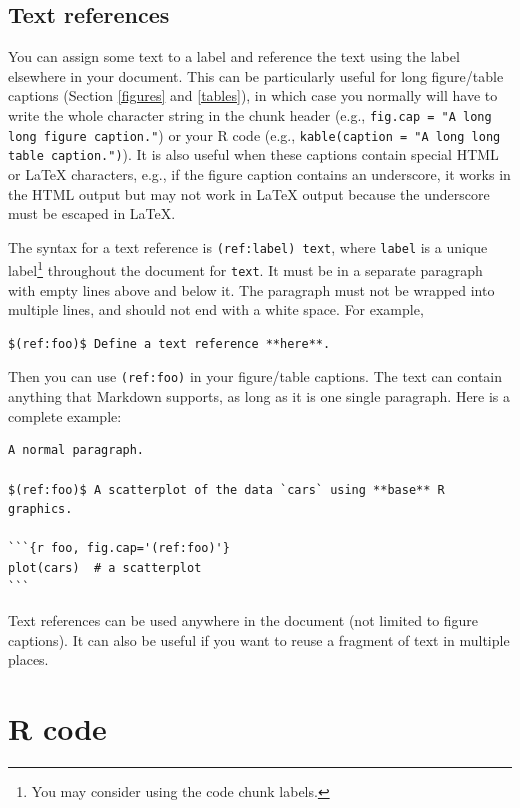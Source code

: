 \documentclass[doctor,openright,twoside]{sjtuthesis}
\newcommand{\passthrough}[1]{#1}
\theoremstyle{plain}
\theoremstyle{definition}
\theoremstyle{remark}
\theoremstyle{ocrenumbox}
\theoremstyle{plain}
\begin{document}
\hypertarget{text-references}{%
\subsection{Text references}\label{text-references}}

You can assign some text to a label and reference the text using the label elsewhere in your document. This can be particularly useful for long figure/table captions (Section \ref{figures} and \ref{tables}), in which case you normally will have to write the whole character string in the chunk header (e.g., \passthrough{\lstinline!fig.cap = "A long long figure caption."!}) or your R code (e.g., \passthrough{\lstinline!kable(caption = "A long long table caption.")!}). It is also useful when these captions contain special HTML or LaTeX characters, e.g., if the figure caption contains an underscore, it works in the HTML output but may not work in LaTeX output because the underscore must be escaped in LaTeX.

The syntax for a text reference is \passthrough{\lstinline!(ref:label) text!}, where \passthrough{\lstinline!label!} is a unique label\footnote{You may consider using the code chunk labels.} throughout the document for \passthrough{\lstinline!text!}. It must be in a separate paragraph with empty lines above and below it. The paragraph must not be wrapped into multiple lines, and should not end with a white space. For example,

\begin{lstlisting}
$(ref:foo)$ Define a text reference **here**. 
\end{lstlisting}

Then you can use \passthrough{\lstinline!(ref:foo)!} in your figure/table captions. The text can contain anything that Markdown supports, as long as it is one single paragraph. Here is a complete example:

\begin{lstlisting}
A normal paragraph.

$(ref:foo)$ A scatterplot of the data `cars` using **base** R graphics. 

```{r foo, fig.cap='(ref:foo)'}
plot(cars)  # a scatterplot
```
\end{lstlisting}

Text references can be used anywhere in the document (not limited to figure captions). It can also be useful if you want to reuse a fragment of text in multiple places.

\hypertarget{r-code}{%
\section{R code}\label{r-code}}
\end{document}
